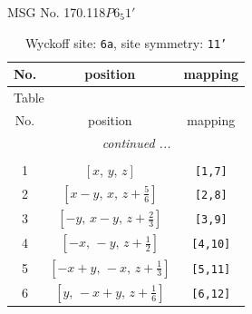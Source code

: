 \documentclass[fleqn,8pt]{jsarticle}
\begin{document}
\setcounter{MaxMatrixCols}{32}

\renewcommand{\tablename}{Table~}
\renewcommand{\figurename}{Figure~}
\begin{center}
\LARGE
MSG No. 170.118\quad$P6_{5}1'$
\end{center}
\renewcommand{\arraystretch}{1.2}
\begin{longtable}{ccc}
\caption{Wyckoff site: {\tt 6a}, site symmetry: {\tt 11'}}
 \\
 \hline \hline
No. & position & mapping \\ \hline \endfirsthead

\multicolumn{2}{l}{\tablename\ \thetable{}} \\
 \hline \hline
No. & position & mapping \\ \hline \endhead

 \hline \hline
\multicolumn{2}{r}{\footnotesize\it continued ...} \\ \endfoot

 \hline \hline
\multicolumn{2}{r}{} \\ \endlastfoot

1 & $\left[ x,\, y,\, z \right]$ & {\tt [1,7]} \\ \hline
2 & $\left[ x - y,\, x,\, z + \frac{5}{6} \right]$ & {\tt [2,8]} \\ \hline
3 & $\left[ - y,\, x - y,\, z + \frac{2}{3} \right]$ & {\tt [3,9]} \\ \hline
4 & $\left[ - x,\, - y,\, z + \frac{1}{2} \right]$ & {\tt [4,10]} \\ \hline
5 & $\left[ - x + y,\, - x,\, z + \frac{1}{3} \right]$ & {\tt [5,11]} \\ \hline
6 & $\left[ y,\, - x + y,\, z + \frac{1}{6} \right]$ & {\tt [6,12]} \\
\end{longtable}
\end{document}

